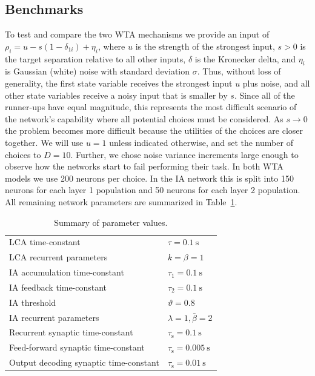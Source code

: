 \documentclass[10pt,letterpaper]{article}
\begin{document}
\subsection{Benchmarks}
To test and compare the two WTA mechanisms we provide an input of $\rho_i = u - s(1 - \delta_{1i}) + \eta_i$, where $u$ is the strength of the strongest input, 
$s > 0$ is the target separation relative to all other inputs, $\delta$ is the Kronecker delta, and $\eta_i$ is Gaussian (white) noise with standard deviation $\sigma$.
Thus, without loss of generality, the first state variable receives the strongest input $u$ plus noise, and all other state variables receive a noisy input that is smaller by $s$.
Since all of the runner-ups have equal magnitude, this represents the most difficult scenario of the network's capability where all potential choices must be considered.
As $s \rightarrow 0$ the problem becomes more difficult because the utilities of the choices are closer together.
We will use $u = 1$ unless indicated otherwise, and set the number of choices to $D = 10$.
Further, we chose noise variance increments large enough to observe how the networks start to fail performing their task.
In both WTA models we use 200 neurons per choice.
In the IA network this is split into 150 neurons for each layer 1 population and 50 neurons for each layer 2 population.
All remaining network parameters are summarized in Table~\ref{tbl:params}.
\begin{table}
    \caption{Summary of parameter values.}\label{tbl:params}
    \begin{tabular}{ll}
        LCA time-constant & $\tau = \SI{0.1}{\second}$ \\
        LCA recurrent parameters & $k = \beta = 1$ \\
        IA accumulation time-constant & $\tau_1 = \SI{0.1}{\second}$ \\
        IA feedback time-constant & $\tau_2 = \SI{0.1}{\second}$ \\
        IA threshold & $\vartheta = 0.8$ \\
        IA recurrent parameters & $\lambda = 1, \bar{\beta} = 2$ \\
        Recurrent synaptic time-constant & $\tau_{\mathrm{s}} 
        = \SI{0.1}{\second}$ \\
        Feed-forward synaptic time-constant & $\tau_{\mathrm{s}} 
        = \SI{0.005}{\second}$ \\
        Output decoding synaptic time-constant & $\tau_{\mathrm{s}} 
        = \SI{0.01}{\second}$
    \end{tabular}
\end{table}
\end{document}
